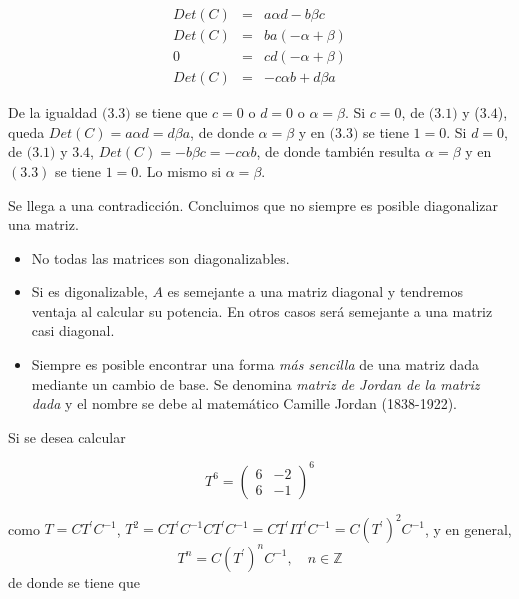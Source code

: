 \bigskip
\begin{eqnarray}
Det(C)&=& a\alpha d - b\beta c \\
Det(C)&=& ba( -\alpha  +   \beta )  \\
0&=&cd( -\alpha  +   \beta )  \\
Det(C)&=& -c \alpha b + d \beta a
\end{eqnarray}
 


\bigskip

\bigskip

De la igualdad $(3$.$3)$  se tiene que $c=0$ o $d=0$ o $\alpha = \beta$. Si $c=0$, de $(3$.$1)$ y ($3$.$4$), queda $Det(C)= a\alpha d= d \beta a$, de donde $\alpha = \beta$ y en $(3$.$3)$ se tiene $1=0$.
Si $d=0$, de $(3$.$1)$ y $3$.$4$,  $Det(C)= - b \beta c = -c\alpha b $, de donde también resulta $\alpha = \beta$ y en $(3.3)$ se tiene $1=0$. Lo mismo si $\alpha = \beta$. 

Se llega a una contradicción. Concluimos que no siempre es posible diagonalizar una matriz.

\bigskip

\begin{remark}
 \begin{itemize}
     \item 
No todas las matrices son diagonalizables.

\item 
Si es digonalizable,  $A$ es semejante a una matriz diagonal y tendremos ventaja al calcular su potencia. En otros casos  será semejante a una matriz casi diagonal.
  \item 
  Siempre es posible encontrar una forma \textit{ más sencilla} de una matriz dada  mediante un cambio de base. Se denomina \textit{matriz de Jordan de la matriz dada} y el nombre se debe al matemático Camille Jordan (1838-1922).
 \end{itemize}   
\end{remark}


\bigskip
Si se desea  calcular 

\bigskip

$$T^6=\left(\begin{array}{cc}  6 & -2  \\ 6 &  -1
\end{array}
 \right)^6$$

\bigskip
\noindent
como  $T=CT^\prime C^{-1}$,  $T^2=CT^\prime C^{-1} CT^\prime C^{-1}=CT^\prime I T^\prime C^{-1}=C(T^\prime)^2 C^{-1}$, y en general, 
$$T^n=C(T^\prime)^n C^{-1}, \quad n \in \mathbb{Z}$$
\noindent
de donde se tiene que 

